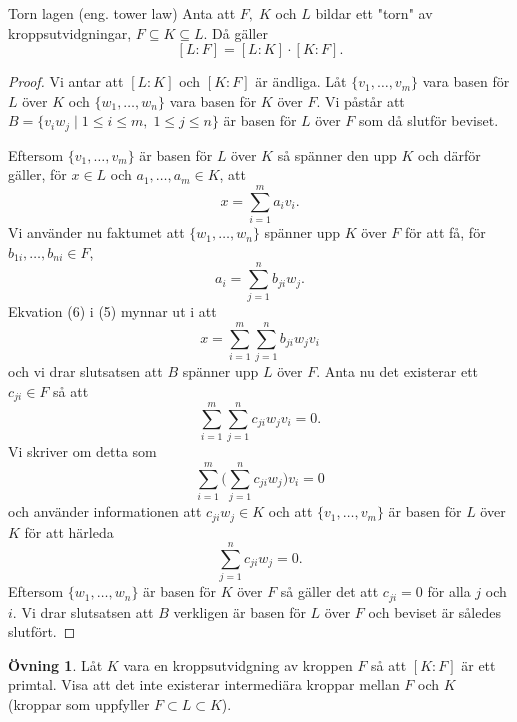 \documentclass{article}
\theoremstyle{definition}
\newtheorem{ovning}[thm]{Övning}
\begin{document}
\hypertarget{torn lagen}{}
\begin{mytheo}{Torn lagen (eng. tower law)}{}
  Anta att $F, \; K$ och $L$ bildar ett "torn" av kroppsutvidgningar, $F \subseteq K \subseteq L$. Då gäller
  \[ [L:F] = [L:K] \cdot [K:F]. \]
\end{mytheo}
\begin{proof}
  Vi antar att $[L:K]$ och $[K:F]$ är ändliga. Låt $\{v_1, \ldots, v_m\}$ vara basen för $L$ över $K$ och $\{w_1, \ldots, w_n\}$ vara basen för $K$ över $F$.
  Vi påstår att $B = \{v_iw_j \; | \; 1 \leq i \leq m, \; 1 \leq j \leq n\}$ är basen för $L$ över $F$ som då slutför beviset.

  Eftersom $\{v_1, \ldots, v_m\}$ är basen för $L$ över $K$ så spänner den upp $K$ och därför gäller, för $x \in L$ och $a_1, \ldots, a_m \in K$, att 
  \begin{equation}
    x = \sum_{i = 1}^m a_i v_i.
  \end{equation}
  Vi använder nu faktumet att $\{w_1, \ldots, w_n\}$ spänner upp $K$ över $F$ för att få, för 
  \linebreak
  $b_{1i}, \ldots, b_{ni} \in F$,
  \begin{equation}
    a_i = \sum_{j = 1}^n b_{ji}w_j.
  \end{equation}
  Ekvation (6) i (5) mynnar ut i att
  \[x = \sum_{i = 1}^m \sum_{j = 1}^n b_{ji}w_jv_i\]
  och vi drar slutsatsen att $B$ spänner upp $L$ över $F$. Anta nu det existerar ett $c_{ji} \in F$ så att 
  \[\sum_{i = 1}^m \sum_{j = 1}^n c_{ji}w_jv_i = 0.\]
  Vi skriver om detta som 
  \[\sum_{i = 1}^m \biggl( \sum_{j = 1}^n c_{ji}w_j \biggl) v_i = 0\]
  och använder informationen att $c_{ji}w_j \in K$ och att $\{v_1, \ldots, v_m\}$ är basen för $L$ över $K$ för att härleda
  \[\sum_{j = 1}^n c_{ji}w_j = 0.\]
  Eftersom $\{w_1, \ldots, w_n\}$ är basen för $K$ över $F$ så gäller det att $c_{ji} = 0$ för alla $j$ och $i$. Vi drar slutsatsen att 
  $B$ verkligen är basen för $L$ över $F$ och beviset är således slutfört. 
\end{proof}

\begin{ovning}
  Låt $K$ vara en kroppsutvidgning av kroppen $F$ så att $[K:F]$ är ett primtal. Visa att det inte existerar intermediära kroppar mellan $F$ och $K$
  (kroppar som uppfyller $F \subset L \subset K$).
\end{ovning}
\end{document}
